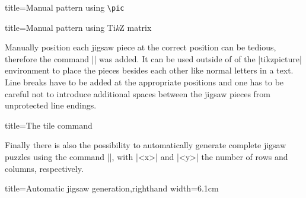 \documentclass{scrartcl}
\begin{document}
\begin{tcblisting}{title={Manual pattern using \texttt{\textbackslash pic}}}
\end{tcblisting}

\begin{tcblisting}{title={Manual pattern using Ti\emph{k}Z matrix}}
\end{tcblisting}

Manually position each jigsaw piece at the correct position can be tedious, therefore the command \saminline|| was added. It can be used outside of of the \saminline|tikzpicture| environment to place the pieces besides each other like normal letters in a text. Line breaks have to be added at the appropriate positions and one has to be careful not to introduce additional spaces between the jigsaw pieces from unprotected line endings.

\begin{tcblisting}{title={The tile command}}
%
%

%
%

%
%
\end{tcblisting}

Finally there is also the possibility to automatically generate complete jigsaw puzzles using the command \saminline||, with \saminline|<x>| and \saminline|<y>| the number of rows and columns, respectively.

\begin{tcblisting}{title={Automatic jigsaw generation},righthand width=6.1cm}
\end{tcblisting}
\end{document}
